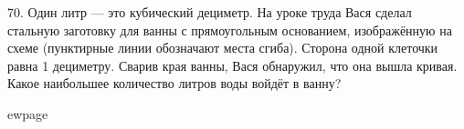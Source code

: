 \begin{center}
\begin{figure}[ht!]
\end{figure}
\end{center}
70. Один литр --- это кубический дециметр. На уроке труда Вася сделал стальную заготовку для ванны с прямоугольным основанием, изображённую на схеме (пунктирные линии обозначают места сгиба). Сторона одной клеточки равна 1 дециметру. Сварив края ванны, Вася обнаружил, что она вышла кривая. Какое наибольшее количество литров воды войдёт в ванну?
\begin{center}
\begin{figure}[ht!]
\end{figure}
\end{center}

ewpage


